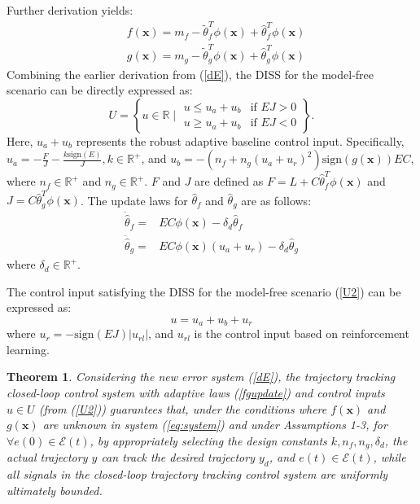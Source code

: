 \documentclass[preprint,12pt]{elsarticle}
\newtheorem{theorem}{Theorem}
\begin{document}
Further derivation yields:
\begin{equation}
  \begin{aligned}
    & f(\mathbf{x}) = m_f - \tilde{\theta}^{T}_f \phi(\mathbf{x}) + \hat{\theta}^{T}_f \phi(\mathbf{x}) \\
    & g(\mathbf{x}) =  m_g - \tilde{\theta}^{T}_g \phi(\mathbf{x}) + \hat{\theta}^{T}_g \phi(\mathbf{x}) \label{fgnw}
  \end{aligned}
\end{equation}
Combining the earlier derivation from (\ref{dE}), the DISS for the model-free scenario can be directly expressed as:
\begin{equation}
    U = \left\{ 
    u \in \mathbb{R} \mid 
    \begin{array}{ll}
    u \leq u_a + u_b & \text{if } EJ > 0 \\
    u \geq u_a + u_b & \text{if } EJ < 0 
    \end{array} 
    \right\}.\label{U2}
\end{equation}
Here, \(u_a + u_b\) represents the robust adaptive baseline control input. Specifically, \(u_a = - \frac{F}{J} - \frac{k\mathrm{sign}(E)}{J}, k \in \mathbb{R}^+\), and \(u_b = -(n_f+n_g(u_a+u_r)^2)\mathrm{sign}(g(\mathbf{x})) EC\), where \(n_f \in \mathbb{R}^+\) and \(n_g \in \mathbb{R}^+\). \(F\) and \(J\) are defined as \(F = L + C \hat{\theta}^{T}_f \phi(\mathbf{x})\) and \(J = C \hat{\theta}^{T}_g \phi(\mathbf{x})\). The update laws for \(\hat{\theta}_f\) and \(\hat{\theta}_g\) are as follows:
\begin{equation}
    \begin{aligned}
        \dot{\hat{\theta}}_f = &  EC\phi(\mathbf{x}) - \delta_d \hat{\theta}_f \\
        \dot{\hat{\theta}}_g = &  EC\phi(\mathbf{x}) (u_a + u_r) - \delta_d \hat{\theta}_g \label{fgupdate}
    \end{aligned}
\end{equation}
where \(\delta_d \in \mathbb{R}^+\).

The control input satisfying the DISS for the model-free scenario (\ref{U2}) can be expressed as:
\begin{equation}
    u = u_a + u_b + u_r\label{u1}
\end{equation}
where \(u_r = - \mathrm{sign}(EJ)|u_{rl}|\), and \(u_{rl}\) is the control input based on reinforcement learning.

\begin{theorem}
    Considering the new error system (\ref{dE}), the trajectory tracking closed-loop control system with adaptive laws (\ref{fgupdate}) and control inputs \(u \in U\) (from (\ref{U2})) guarantees that, under the conditions where \(f(\mathbf{x})\) and \(g(\mathbf{x})\) are unknown in system (\ref{eq:system}) and under Assumptions 1-3, for \(\forall e(0) \in \mathcal{E}(t)\), by appropriately selecting the design constants \(k, n_f, n_g,\delta_d\), the actual trajectory \(y\) can track the desired trajectory \(y_d\), and \(e(t) \in \mathcal{E}(t)\), while all signals in the closed-loop trajectory tracking control system are uniformly ultimately bounded.
\end{theorem}
\end{document}
